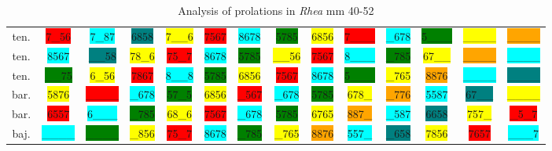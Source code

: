 \begin{table}[H]
{\begin{tabular}{ c | c c c c c c c c c c c c c }
ten. & \colorbox{red}{7\_56} & \colorbox{cyan}{7\_87} & \colorbox{teal}{6858} & \colorbox{yellow}{7\_\_6} & \colorbox{red}{7567} & \colorbox{cyan}{8678} & \colorbox{green}{5785} & \colorbox{yellow}{6856} & \colorbox{red}{7\_\_\_} & \colorbox{cyan}{\_678} & \colorbox{green}{5\_\_\_} & \colorbox{yellow}{\_\_\_\_} & \colorbox{orange}{\_\_\_\_} \\
ten. & \colorbox{cyan}{8567} & \colorbox{teal}{\_\_58} & \colorbox{yellow}{78\_6} & \colorbox{red}{75\_7} & \colorbox{cyan}{8678} & \colorbox{green}{5785} & \colorbox{yellow}{\_\_56} & \colorbox{red}{7567} & \colorbox{cyan}{8\_\_\_} & \colorbox{green}{\_785} & \colorbox{yellow}{67\_\_} & \colorbox{orange}{\_\_\_\_} & \colorbox{cyan}{\_\_\_\_} \\
ten. & \colorbox{green}{\_\_75} & \colorbox{yellow}{6\_56} & \colorbox{red}{7867} & \colorbox{cyan}{8\_\_8} & \colorbox{green}{5785} & \colorbox{yellow}{6856} & \colorbox{red}{7567} & \colorbox{cyan}{8678} & \colorbox{green}{5\_\_\_} & \colorbox{yellow}{\_765} & \colorbox{orange}{8876} & \colorbox{cyan}{\_\_\_\_} & \colorbox{teal}{\_\_\_\_} \\
bar. & \colorbox{yellow}{5876} & \colorbox{red}{\_\_\_\_} & \colorbox{cyan}{\_678} & \colorbox{green}{57\_5} & \colorbox{yellow}{6856} & \colorbox{red}{\_567} & \colorbox{cyan}{\_678} & \colorbox{green}{5785} & \colorbox{yellow}{678\_} & \colorbox{orange}{\_776} & \colorbox{cyan}{5587} & \colorbox{teal}{67\_\_} & \colorbox{yellow}{\_\_\_\_} \\
bar. & \colorbox{red}{6557} & \colorbox{cyan}{6\_\_\_} & \colorbox{green}{\_785} & \colorbox{yellow}{68\_6} & \colorbox{red}{7567} & \colorbox{cyan}{\_678} & \colorbox{green}{5785} & \colorbox{yellow}{6765} & \colorbox{orange}{887\_} & \colorbox{cyan}{\_587} & \colorbox{teal}{6658} & \colorbox{yellow}{757\_} & \colorbox{red}{\_5\_7} \\
baj. & \colorbox{cyan}{\_\_\_\_} & \colorbox{green}{\_\_\_\_} & \colorbox{yellow}{\_856} & \colorbox{red}{75\_7} & \colorbox{cyan}{8678} & \colorbox{green}{\_785} & \colorbox{yellow}{\_765} & \colorbox{orange}{8876} & \colorbox{cyan}{557\_} & \colorbox{teal}{\_658} & \colorbox{yellow}{7856} & \colorbox{red}{7657} & \colorbox{cyan}{\_\_\_7} \\
\end{tabular}
}
\caption{Analysis of prolations in \textit{Rhea} mm 40-52}
    \label{fig:rhea-prolations-40-52}
\end{table}

